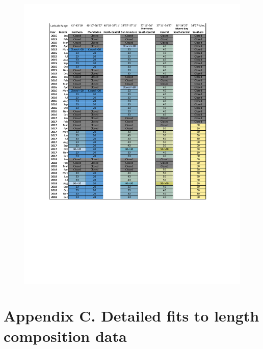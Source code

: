\documentclass[12pt,]{article}
\begin{document}
\begin{figure}
\centering
\includegraphics{Figures/Rec_regs4.pdf}
\caption{\label{fig:Rec_reg4}}
\end{figure}

\FloatBarrier
\newpage

\section*{Appendix C. Detailed fits to length composition
data}\label{appendix-c.-detailed-fits-to-length-composition-data}

\renewcommand{\thepage}{C-\arabic{page}}
\renewcommand{\thefigure}{C\arabic{figure}}

\setcounter{page}{1} \setcounter{figure}{1}
\end{document}

